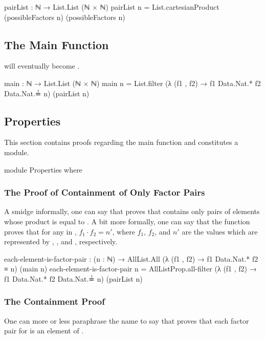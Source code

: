 \documentclass{report}
\begin{document}
\begin{code}
  pairList : ℕ → List.List (ℕ × ℕ)
  pairList n = List.cartesianProduct (possibleFactors n) (possibleFactors n)
\end{code}

\subsection{The Main Function}\label{sec:bifactorNat-main}
 will eventually become .

\begin{code}
  main : ℕ → List.List (ℕ × ℕ)
  main n = List.filter (λ (f1 , f2) → f1 Data.Nat.* f2 Data.Nat.≟ n)
                       (pairList n)
\end{code}

\subsection{Properties}
This section contains proofs regarding the main function and constitutes a module.

\begin{code}
  module Properties where
\end{code}

\subsubsection{The Proof of Containment of Only Factor Pairs}
A smidge informally, one can say that  proves that   contains only pairs of elements whose product is equal to .  A bit more formally, one can say that the function proves that for any  \AgdaOperator{\AgdaInductiveConstructor{,}}  in  , \(f_1 \cdot f_2 = n\prime\), where \(f_1\), \(f_2\), and \(n\prime\) are the values which are represented by , , and , respectively.

\begin{code}
    each-element-is-factor-pair :
      (n : ℕ) →
      AllList.All (λ (f1 , f2) → f1 Data.Nat.* f2 ≡ n) (main n)
    each-element-is-factor-pair n =
      AllListProp.all-filter
        (λ (f1 , f2) → f1 Data.Nat.* f2 Data.Nat.≟ n)
        (pairList n)
\end{code}

\subsubsection{The Containment Proof}
One can more or less paraphrase the name to say that  proves that each factor pair for  is an element of  .
\end{document}
